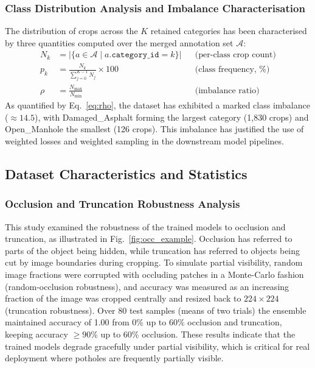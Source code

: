 \documentclass{article}
\begin{document}
\subsubsection*{Class Distribution Analysis and Imbalance Characterisation}
\label{sec:class_dist}
The distribution of crops across the $K$ retained categories has been characterised by three quantities computed over the merged annotation set $\mathcal{A}$:
\begin{align}
  N_k  &= \bigl|\{a \in \mathcal{A} \mid a.\texttt{category\_id}=k\}\bigr|
         && \text{(per-class crop count)} \label{eq:Nk}\\[4pt]
  p_k  &= \frac{N_k}{\displaystyle\sum_{j=0}^{K-1} N_j} \times 100
         && \text{(class frequency, \%)} \label{eq:pk}\\[4pt]
  \rho &= \frac{N_{\max}}{N_{\min}}
         && \text{(imbalance ratio)} \label{eq:rho}
\end{align}
As quantified by Eq.~\eqref{eq:rho}, the dataset has exhibited a marked class imbalance (\rho$\approx14.5$), with Damaged\_Asphalt forming the largest category (1{,}830 crops) and Open\_Manhole the smallest (126 crops). This imbalance has justified the use of weighted losses and weighted sampling in the downstream model pipelines.

\subsection*{Dataset Characteristics and Statistics}
\subsubsection*{Occlusion and Truncation Robustness Analysis}
This study examined the robustness of the trained models to occlusion and truncation, as illustrated in Fig.~\ref{fig:occ_example}. Occlusion has referred to parts of the object being hidden, while truncation has referred to objects being cut by image boundaries during cropping. To simulate partial visibility, random image fractions were corrupted with occluding patches in a Monte-Carlo fashion (random-occlusion robustness), and accuracy was measured as an increasing fraction of the image was cropped centrally and resized back to $224\times224$ (truncation robustness). Over 80 test samples (means of two trials) the ensemble maintained accuracy of 1.00 from 0\% up to 60\% occlusion and truncation, keeping accuracy $\geq 90\%$ up to 60\% occlusion. These results indicate that the trained models degrade gracefully under partial visibility, which is critical for real deployment where potholes are frequently partially visible.
\end{document}
